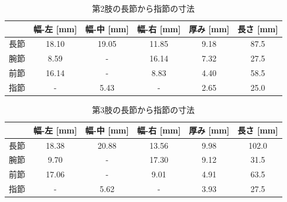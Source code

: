 \begin{table}[htbp]
  \centering
  \caption{第2肢の長節から指節の寸法}
  \label{tab:2setu}
  \vspace{-3mm}
  \begin{tabular}{|l|c|c|c|c|c|}
  \hline
     & \multicolumn{1}{l|}{幅-左 [mm]} & \multicolumn{1}{l|}{幅-中 [mm]} & \multicolumn{1}{l|}{幅-右 [mm]} & \multicolumn{1}{l|}{厚み [mm]} & \multicolumn{1}{l|}{長さ [mm]} \\ \hline
  長節 & 18.10                       & 19.05                       & 11.85                       & 9.18                        & 87.5                        \\ \hline
  腕節 & 8.59                        & -                           & 16.14                       & 7.32                        & 27.5                        \\ \hline
  前節 & 16.14                       & -                           & 8.83                        & 4.40                        & 58.5                        \\ \hline
  指節 & -                           & 5.43                        & -                           & 2.65                        & 25.0                        \\ \hline
  \end{tabular}
\end{table}
%
\begin{table}[htbp]
  \centering
  \caption{第3肢の長節から指節の寸法}
  \label{tab:3setu}
  \vspace{-3mm}
  \begin{tabular}{|l|c|c|c|c|c|}
  \hline
     & \multicolumn{1}{l|}{幅-左 [mm]} & \multicolumn{1}{l|}{幅-中 [mm]} & \multicolumn{1}{l|}{幅-右 [mm]} & \multicolumn{1}{l|}{厚み [mm]} & \multicolumn{1}{l|}{長さ [mm]} \\ \hline
  長節 & 18.38                       & 20.88                       & 13.56                       & 9.98                        & 102.0                       \\ \hline
  腕節 & 9.70                        & -                           & 17.30                       & 9.12                        & 31.5                        \\ \hline
  前節 & 17.06                       & -                           & 9.01                        & 4.91                        & 63.5                        \\ \hline
  指節 & -                           & 5.62                        & -                           & 3.93                        & 27.5                        \\ \hline
  \end{tabular}
\end{table}
